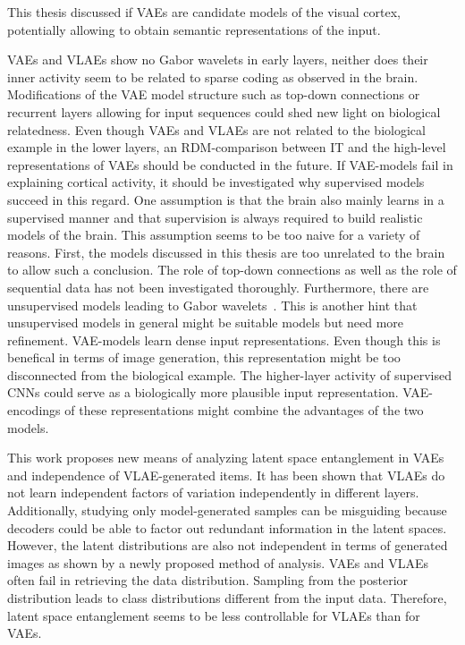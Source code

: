 This thesis discussed if \acfp{VAE} are candidate models of the visual cortex, potentially allowing to obtain semantic representations of the input.

\acp{VAE} and \acp{VLAE} show no Gabor wavelets in early layers, neither does their inner activity seem to be related to sparse coding as observed in the brain.
Modifications of the \ac{VAE} model structure such as top-down connections or recurrent layers allowing for input sequences could shed new light on biological relatedness.
Even though \acp{VAE} and \acp{VLAE} are not related to the biological example in the lower layers, an \ac{RDM}-comparison between \ac{IT} and the high-level representations of \acp{VAE} should be conducted in the future.
If \ac{VAE}-models fail in explaining cortical activity, it should be investigated why supervised models succeed in this regard.
One assumption is that the brain also mainly learns in a supervised manner and that supervision is always required to build realistic models of the brain.
This assumption seems to be too naive for a variety of reasons.
First, the models discussed in this thesis are too unrelated to the brain to allow such a conclusion.
The role of top-down connections as well as the role of sequential data has not been investigated thoroughly.
Furthermore, there are unsupervised models leading to Gabor wavelets~\citep{Olshausen1996,berkes2005slow}.
This is another hint that unsupervised models in general might be suitable models but need more refinement.
\ac{VAE}-models learn dense input representations.
Even though this is benefical in terms of image generation, this representation might be too disconnected from the biological example.
The higher-layer activity of supervised \acp{CNN} could serve as a biologically more plausible input representation.
\ac{VAE}-encodings of these representations might combine the advantages of the two models.

This work proposes new means of analyzing latent space entanglement in \acp{VAE} and independence of \ac{VLAE}-generated items.
It has been shown that \acp{VLAE} do not learn independent factors of variation independently in different layers.
Additionally, studying only model-generated samples can be misguiding because decoders could be able to factor out redundant information in the latent spaces.
However, the latent distributions are also not independent in terms of generated images as shown by a newly proposed method of analysis.
\acp{VAE} and \acp{VLAE} often fail in retrieving the data distribution.
Sampling from the posterior distribution leads to class distributions different from the input data.
Therefore, latent space entanglement seems to be less controllable for \acp{VLAE} than for \acp{VAE}.

